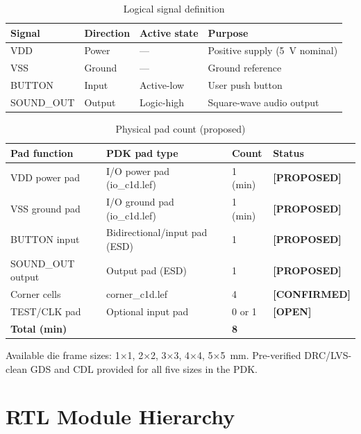\documentclass[11pt,a4paper]{article}
\newcommand{\proposed}{\textcolor{proposed}{\textbf{[PROPOSED]}}}
\newcommand{\openitem}{\textcolor{open}{\textbf{[OPEN]}}}
\newcommand{\confirmed}{\textcolor{frozen}{\textbf{[CONFIRMED]}}}
\begin{document}
\begin{table}[H]
  \centering
  \caption{Logical signal definition}
  \begin{tabular}{llll}
    \toprule
    \textbf{Signal} & \textbf{Direction} & \textbf{Active state} & \textbf{Purpose} \\
    \midrule
    VDD        & Power   & ---         & Positive supply (5~V nominal) \\
    VSS        & Ground  & ---         & Ground reference \\
    BUTTON     & Input   & Active-low  & User push button \\
    SOUND\_OUT & Output  & Logic-high  & Square-wave audio output \\
    \bottomrule
  \end{tabular}
\end{table}

\begin{table}[H]
  \centering
  \caption{Physical pad count (proposed)}
  \begin{tabular}{llll}
    \toprule
    \textbf{Pad function} & \textbf{PDK pad type} & \textbf{Count} & \textbf{Status} \\
    \midrule
    VDD power pad   & I/O power pad (io\_c1d.lef)   & 1 (min) & \proposed \\
    VSS ground pad  & I/O ground pad (io\_c1d.lef)  & 1 (min) & \proposed \\
    BUTTON input    & Bidirectional/input pad (ESD) & 1        & \proposed \\
    SOUND\_OUT output & Output pad (ESD)             & 1        & \proposed \\
    Corner cells    & corner\_c1d.lef               & 4        & \confirmed \\
    TEST/CLK pad    & Optional input pad            & 0 or 1  & \openitem \\
    \midrule
    \textbf{Total (min)} & & \textbf{8} & \\
    \bottomrule
  \end{tabular}
\end{table}

Available die frame sizes: 1$\times$1, 2$\times$2, 3$\times$3, 4$\times$4, 5$\times$5~mm.
Pre-verified DRC/LVS-clean GDS and CDL provided for all five sizes in the PDK.

\section{RTL Module Hierarchy}
\end{document}
